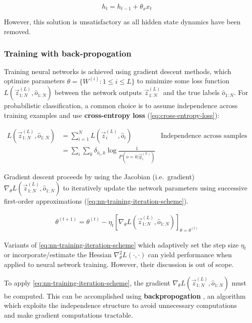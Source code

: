 \documentclass[dissertation.tex]{subfile}
\begin{document}
\begin{equation}
    h_t = h_{t-1} + \theta_x x_t
\end{equation}

However, this solution is unsatisfactory as all hidden state dynamics have been
removed.


\subsubsection{Training with back-propogation}

Training neural networks is achieved using gradient descent methods, which
optimize parameters $\theta = \{W^{(i)} : 1 \leq i \leq L \}$ to minimize some
loss function $L(\vec{z}^{(L)}_{1:N}, \hat{o}_{1:N})$ between the network
outputs $\vec{z}^{(L)}_{1:N}$ and the true labels $\hat{o}_{1:N}$. For
probabilistic classification, a common choice is to assume independence
across training examples and use \textbf{cross-entropy loss}
(\autoref{eq:cross-entropy-loss}):

\begin{align}
    L(\vec{z}^{(L)}_{1:N}, \hat{o}_{1:N})
    &= \sum_{i=1}^{N} L(\vec{z}^{(L)}_i, \hat{o}_i) &\mbox{Independence across samples} \nonumber\\
    &= \sum_i \sum_k \delta_{\hat{o}_i,k} \log \frac{1}{P(o=k | \vec{y}_i^{(L)})} & \label{eq:cross-entropy-loss}
\end{align}

Gradient descent proceeds by using the Jacobian (i.e.\ gradient) $\nabla_\theta
L(\vec{z}^{(L)}_{1:N}, \hat{o}_{1:N})$ to iteratively update the network
parameters using successive first-order approximations (\autoref{eq:nn-training-iteration-scheme}).

\begin{align}
    \label{eq:nn-training-iteration-scheme}
    \theta^{(t+1)} = \theta^{(t)}
    - \eta_t \left[ \nabla_\theta L(\vec{z}^{(L)}_{1:N}, \hat{o}_{1:N}) \right]_{\theta = \theta^{(t)}}
\end{align}

Variants of \autoref{eq:nn-training-iteration-scheme} which adaptively set the
step size $\eta_t$ or incorporate/estimate the Hessian $\nabla^2_{\theta}
L(\cdot, \cdot)$ can yield performance when applied to neural network training.
However, their discussion is out of scope. 

To apply \autoref{eq:nn-training-iteration-scheme}, the gradient $\nabla_\theta
L(\vec{z}^{(L)}_{1:N}, \hat{o}_{1:N})$ must be computed. This can be
accomplished using \textbf{backpropogation} , an algorithm which
exploits the independence structure to avoid unnecessary computations and make
gradient computations tractable.
\end{document}
